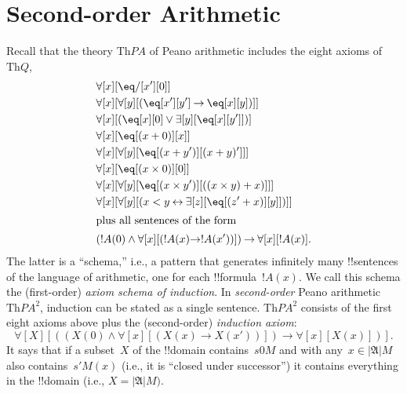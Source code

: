 \documentclass[10pt,a4paper]{article}
\theoremstyle{plain}
\theoremstyle{definition}
\theoremstyle{remark}
\newcommand*{\olfileid}[3]{}
\newcommand*{\olsection}[1]{\section*{#1}}
\newcommand*{\olimport}[1]{}
\providecommand{\lif}{\mathbin{\rightarrow}}
\providecommand{\lforall}{\mathord{\forall}}
\providecommand{\lexists}{\mathord{\exists}}
\providecommand{\Obj}{}
\providecommand{\Domain}{\ensuremath{|\mathfrak{A}|}}
\providecommand{\Assign}{\ensuremath{s}}
\providecommand{\Th}{\ensuremath{\mathrm{Th}}}
\providecommand{\liff}{\mathbin{\leftrightarrow}}
\begin{document}
\olimport{introduction}

\olimport{second-order-arithmetic}

\olimport{undecidability-and-axiomatizability}

\olimport{compactness}

\olimport{loewenheim-skolem}

\OLEndChapterHook





\olfileid{sol}{met}{spa}

\olsection{Second-order Arithmetic}

Recall that the theory $\Th{PA}$ of Peano arithmetic includes the
eight axioms of~$\Th{Q}$,
\begin{align*}
& \lforall[x][\eq/[x'][\Obj 0]]\\
& \lforall[x][\lforall[y][(\eq[x'][y'] \lif \eq[x][y])]]\\
& \lforall[x][(\eq[x][\Obj 0] \lor \lexists[y][\eq[x][y']])]\\ 
& \lforall[x][\eq[(x + \Obj 0)][x]]\\
& \lforall[x][\lforall[y][\eq[(x + y')][(x + y)']]]\\
& \lforall[x][\eq[(x \times \Obj 0)][\Obj 0]]\\
& \lforall[x][\lforall[y][\eq[(x \times y')][((x \times y) + x)]]]\\
& \lforall[x][\lforall[y][(x < y \liff \lexists[z][\eq[(z' + x)][y]])]]\\
\intertext{plus all sentences of the form}
& (!A(\Obj 0) \land \lforall[x][(!A(x) \lif !A(x'))]) \lif \lforall[x][!A(x)].
\end{align*}
The latter is a ``schema,'' i.e., a pattern that generates infinitely
many !!{sentence}s of the language of arithmetic, one for each
!!{formula}~$!A(x)$. We call this schema the (first-order)
\emph{axiom schema of induction}. 
In \emph{second-order} Peano arithmetic~$\Th{PA^2}$, induction
can be stated as a single sentence. $\Th{PA^2}$
consists of the first eight axioms above plus the (second-order)
\emph{induction axiom}:
\[
\lforall[X][((X(\Obj 0) \land \lforall[x][(X(x) \lif X(x'))]) \lif \lforall[x][X(x)])].
\]
It says that if a subset~$X$ of the !!{domain}
contains~$\Assign{\Obj{0}}{M}$ and with any~$x \in \Domain{M}$ also
contains~$\Assign{\prime}{M}(x)$ (i.e., it is ``closed under
successor'') it contains everything in the !!{domain} (i.e., $X =
\Domain{M})$.
\end{document}
